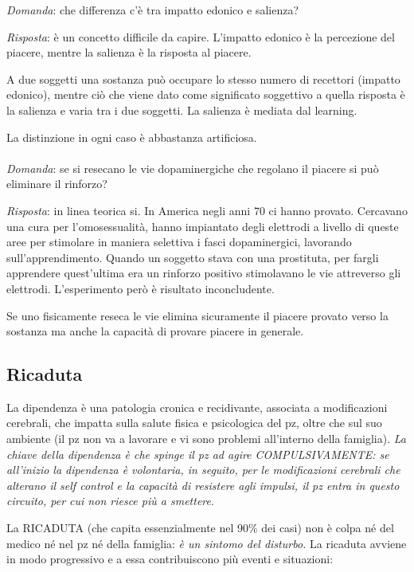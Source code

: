 \emph{Domanda}: che differenza c'è tra impatto edonico e salienza?

\emph{Risposta}: è un concetto difficile da capire. L'impatto edonico è
la percezione del piacere, mentre la salienza è la risposta al piacere.

A due soggetti una sostanza può occupare lo stesso numero di recettori
(impatto edonico), mentre ciò che viene dato come significato soggettivo
a quella risposta è la salienza e varia tra i due soggetti. La salienza
è mediata dal learning.

La distinzione in ogni caso è abbastanza artificiosa.
\\\\
\emph{Domanda}: se si resecano le vie dopaminergiche che regolano il
piacere si può eliminare il rinforzo?

\emph{Risposta}: in linea teorica si. In America negli anni 70 ci hanno
provato. Cercavano una cura per l'omosessualità, hanno impiantato degli
elettrodi a livello di queste aree per stimolare in maniera selettiva i
fasci dopaminergici, lavorando sull'apprendimento. Quando un soggetto
stava con una prostituta, per fargli apprendere quest'ultima era un
rinforzo positivo stimolavano le vie attreverso gli elettrodi.
L'esperimento però è risultato inconcludente.

Se uno fisicamente reseca le vie elimina sicuramente il piacere provato
verso la sostanza ma anche la capacità di provare piacere in generale.

\subsection{Ricaduta}

La dipendenza è una patologia cronica e recidivante, associata a
modificazioni cerebrali, che impatta sulla salute fisica e psicologica
del pz, oltre che sul suo ambiente (il pz non va a lavorare e vi sono
problemi all'interno della famiglia). \emph{La chiave della dipendenza è
che spinge il pz ad agire COMPULSIVAMENTE: se all'inizio la dipendenza è
volontaria, in seguito, per le modificazioni cerebrali che alterano il
self control e la capacità di resistere agli impulsi, il pz entra in
questo circuito, per cui non riesce più a smettere}.

La RICADUTA (che capita essenzialmente nel 90\% dei casi) non è colpa né
del medico né nel pz né della famiglia: \emph{è un sintomo del
disturbo.} La ricaduta avviene in modo progressivo e a essa
contribuiscono più eventi e situazioni:

